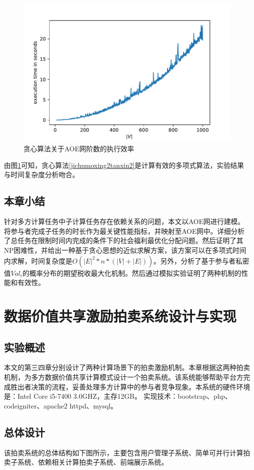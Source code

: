 \documentclass[promaster]{thesis-uestc}
\begin{document}
\begin{figure}[h]
    \includegraphics{exp/exetime.pdf}
    \caption{贪心算法关于AOE网阶数的执行效率}
    \label{exetime}
\end{figure}
由图\ref{exetime}可知，贪心算法\ref{jichumoxing2tanxin2}是计算有效的多项式算法，实验结果与时间复杂度分析吻合。

\section{本章小结}
针对多方计算任务中子计算任务存在依赖关系的问题，本文以AOE网进行建模。将参与者完成子任务的时长作为最关键性能指标，并映射至AOE网中。详细分析了总任务在限制时间内完成的条件下的社会福利最优化分配问题。然后证明了其NP困难性，并给出一种基于贪心思想的近似求解方案，该方案可以在多项式时间内求解，时间复杂度是$O(|E|^2*n*(|V|+|E|))$。另外，分析了基于参与者私密值$Val_i$的概率分布的期望税收最大化机制。然后通过模拟实验证明了两种机制的性能和有效性。


\chapter{数据价值共享激励拍卖系统设计与实现}
\section{实验概述}
本文的第三四章分别设计了两种计算场景下的拍卖激励机制。本章根据这两种拍卖机制，为多方数据价值共享计算模式设计一个拍卖系统。该系统能够帮助平台方完成胜出者决策的流程，妥善处理多方计算中的参与者竞争现象。本系统的硬件环境是：Intel Core i5-7400 3.0GHZ，主存12GB。
实现技术：bootstrap、php、codeigniter、apache2 httpd、mysql。
\section{总体设计}
该拍卖系统的总体结构如下图所示，主要包含用户管理子系统、简单可并行计算拍卖子系统、依赖相关计算拍卖子系统、前端展示系统。
\end{document}

